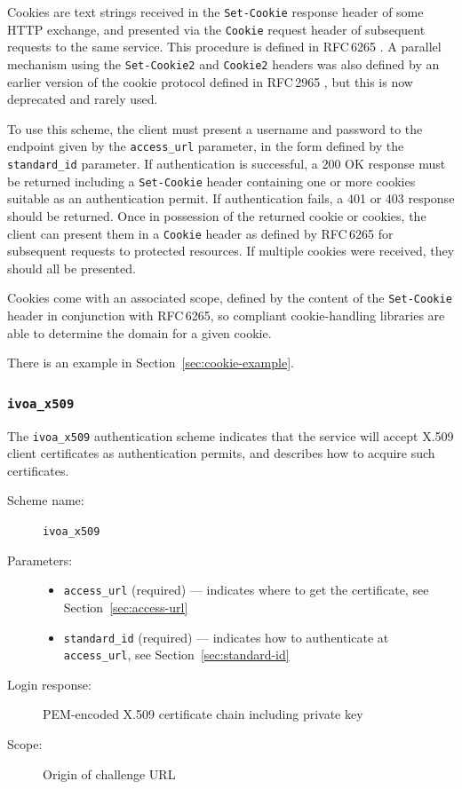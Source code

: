 \documentclass[11pt,a4paper]{ivoa}
\newcommand{\rfc}[1]{RFC\,#1}
\newcommand{\header}[1]{{\tt #1}}
\begin{document}
Cookies are text strings received in the {\tt Set-Cookie}
response header of some HTTP exchange,
and presented via the {\tt Cookie} request header of subsequent
requests to the same service.
This procedure is defined in \rfc{6265} \citep{std:RFC6265}.
A parallel mechanism using the {\tt Set-Cookie2} and {\tt Cookie2}
headers was also defined by an earlier version of the cookie protocol
defined in \rfc{2965} \citep{std:RFC2965},
but this is now deprecated and rarely used.

To use this scheme, the client must present a username and password
to the endpoint given by the \verb|access_url| parameter,
in the form defined by the \verb|standard_id| parameter.
If authentication is successful, a 200 OK response must be returned
including a \header{Set-Cookie} header containing one or more cookies
suitable as an authentication permit.
If authentication fails, a 401 or 403 response should be returned.
Once in possession of the returned cookie or cookies,
the client can present them in a \header{Cookie} header as defined
by \rfc{6265} for subsequent requests to protected resources.
If multiple cookies were received, they should all be presented.

Cookies come with an associated scope, defined by the content
of the \header{Set-Cookie} header in conjunction with \rfc{6265},
so compliant cookie-handling
libraries are able to determine the domain for a given cookie.

There is an example in Section~\ref{sec:cookie-example}.


\subsubsection{\mbox{\tt ivoa\_x509}}\label{sec:ivoa-x509}

The \verb|ivoa_x509| authentication scheme indicates that the service
will accept X.509 client certificates as authentication permits,
and describes how to acquire such certificates.


\begin{description}
  \item[Scheme name:] \verb|ivoa_x509|
  \item[Parameters:] \mbox{}
  \begin{itemize}
    \item \verb|access_url| (required) ---
          indicates where to get the certificate,
          see Section~\ref{sec:access-url}
    \item \verb|standard_id| (required) ---
          indicates how to authenticate at \verb|access_url|,
          see Section~\ref{sec:standard-id}
  \end{itemize}
  \item[Login response:] PEM-encoded X.509 certificate chain
                         including private key
  \item[Scope:] Origin of challenge URL
\end{description}
\end{document}
